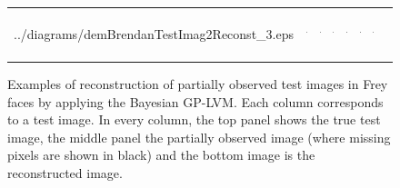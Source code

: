 \documentclass[twoside,times]{article}
\begin{document}
\begin{figure}[ht]
\begin{center}
\begin{tabular}{cccccccc}
{../diagrams/demBrendanTestImag2Reconst_3.eps} &
\includegraphics[width=16mm,height=13mm]
{../diagrams/demBrendanTestImag4Reconst_3.eps}&
\includegraphics[width=16mm,height=13mm]
{../diagrams/demBrendanTestImag11Reconst_3.eps}&
\includegraphics[width=16mm,height=13mm]
{../diagrams/demBrendanTestImag24Reconst_3.eps}&
\includegraphics[width=16mm,height=13mm]
{../diagrams/demBrendanTestImag51Reconst_3.eps}&
\includegraphics[width=16mm,height=13mm]
{../diagrams/demBrendanTestImag62Reconst_3.eps}&
\includegraphics[width=16mm,height=13mm]
{../diagrams/demBrendanTestImag127Reconst_3.eps}
\end{tabular}
\caption{Examples of reconstruction of partially observed test images 
in Frey faces by applying the Bayesian GP-LVM. Each column corresponds to a test
image. In every column, the top panel shows the true test image, 
the middle panel the partially observed image (where missing pixels are
shown in black) and the bottom image is the reconstructed image. 
\label{fig:BrendanFaces}}
\end{center}
\end{figure}
\end{document}
